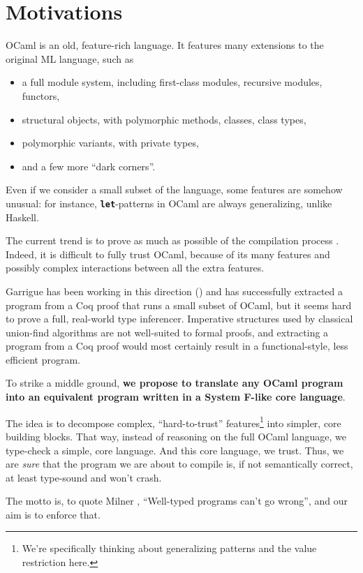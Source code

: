 \documentclass[10pt,a4paper,twoside,titlepage,twocolumn]{article}
\newcommand{\code}[1]{\textbf{\texttt{#1}}}
\begin{document}
\section{Motivations}

OCaml is an old, feature-rich language. It features many extensions to the
original ML language, such as
\begin{itemize}
  \item a full module system, including first-class modules, recursive modules,
    functors,
  \item structural objects, with polymorphic methods, classes, class types,
  \item polymorphic variants, with private types,
  \item and a few more ``dark corners''.
\end{itemize}

Even if we consider a small subset of the language, some features are somehow
unusual: for instance, \code{let}-patterns in OCaml are always generalizing,
unlike Haskell.

The current trend is to prove as much as possible of the compilation process
\cite{compcert}.  Indeed, it is difficult to fully trust OCaml, because of its
many features and possibly complex interactions between all the extra features.

Garrigue has been working in this direction (\cite{garrigue-certified}) and has
successfully extracted a program from a Coq proof that runs a small subset of
OCaml, but it seems hard to prove a full, real-world type inferencer. Imperative
structures used by classical union-find algorithms are not well-suited to formal
proofs, and extracting a program from a Coq proof would most certainly result in
a functional-style, less efficient program.

To strike a middle ground, \textbf{we propose to translate any OCaml program
into an equivalent program written in a System F-like core language}.

The idea is to decompose complex, ``hard-to-trust'' features\footnote{We're
specifically thinking about generalizing patterns and the value restriction
here.} into simpler, core building blocks. That way, instead of reasoning on
the full OCaml language, we type-check a simple, core language. And this core
language, we trust. Thus, we are \emph{sure} that the program we are about to
compile is, if not semantically correct, at least type-sound and won't crash.

The motto is, to quote Milner \cite{milner1978theory}, ``Well-typed programs
can't go wrong'', and our aim is to enforce that.
\end{document}

